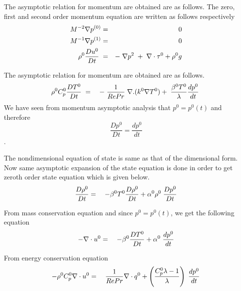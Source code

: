 \documentclass[10pt]{ubthesis}
\begin{document}
\noindent The asymptotic relation for momentum are obtained are as follows.  The zero, first and second order momentum equation are written as follows respectively
\begin{eqnarray}
M^{-2}\nabla p^{(0)} &=& 0\\
M^{-1}\nabla p^{(1)} &=& 0\\
\rho^0 \frac{D u^0}{D t} \hspace{1mm} &=& -\hspace{1mm}\nabla p^2\hspace{1mm}+\hspace{1mm}\nabla \cdot \tau^0 + \rho^0 g
\end{eqnarray}

\noindent The asymptotic relation for momentum are obtained are as follows.
\begin{eqnarray}
\rho^0 C_p^0\frac{D T^0}{D t} \hspace{1mm}&=&\hspace{1mm}-\hspace{1mm}\frac{1}{Re Pr} \hspace{1mm}\nabla.(k^0 \nabla T^0) + \hspace{1mm} \frac{\beta^0 T^0}{\lambda} \frac{d p^0}{d t}\hspace{1mm}
\end{eqnarray}
We have seen from momentum asymptotic analysis that $p^0=p^0(t)$ and therefore $$\frac{D p^0}{D t}= \frac{d p^0}{d t}$$. 
 
\noindent The nondimensional equation of state is same as that of the dimensional form. Now same asymptotic expansion of the state equation is done in order to get zeroth order state equation which is given below. 
\begin{eqnarray}
\frac{D \rho^0}{D t} &=& \hspace{1mm} - \beta^0 T^0 \frac{D \rho^0}{D t} + \alpha^0 \rho^0 \hspace{1mm}\frac{D p^0}{D t}
\end{eqnarray}

\noindent From mass conservation equation and since $p^0=p^0(t)$, we get the following equation
\begin{eqnarray}
- \nabla \cdot u^0 &=& \hspace{1mm} - \beta^0  \frac{D T^0}{D t} + \alpha^0  \hspace{1mm}\frac{d p^0}{d t}
\end{eqnarray}

\noindent From energy conservation equation
\begin{eqnarray}
- \rho^0 C_p^0 \nabla \cdot u^0 &=& \hspace{1mm}  \frac{1}{Re Pr}\nabla \cdot q^0 + \left(\frac{C_p^0 \lambda -1 }{\lambda}  \right)\hspace{1mm}\frac{d p^0}{d t}
\end{eqnarray}
\end{document}
